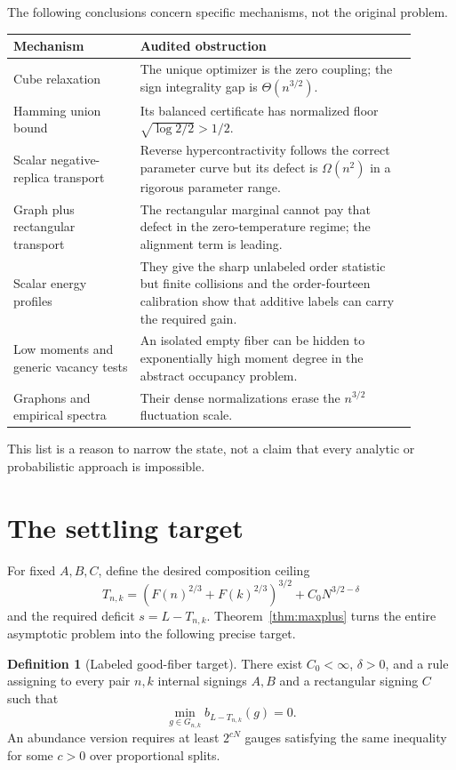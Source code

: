 \documentclass[11pt]{article}
\theoremstyle{definition}
\newtheorem{definition}[theorem]{Definition}
\theoremstyle{remark}
\begin{document}
The following conclusions concern specific mechanisms, not the original
problem.
\begin{center}
\begin{tabular}{p{0.29\linewidth}p{0.61\linewidth}}
\toprule
Mechanism & Audited obstruction \\
\midrule
Cube relaxation & The unique optimizer is the zero coupling; the sign
integrality gap is $\Theta(n^{3/2})$.\\
Hamming union bound & Its balanced certificate has normalized floor
$\sqrt{\log2/2}>1/2$.\\
Scalar negative-replica transport & Reverse hypercontractivity follows the
correct parameter curve but its defect is $\Omega(n^2)$ in a rigorous
parameter range.\\
Graph plus rectangular transport & The rectangular marginal cannot pay that
defect in the zero-temperature regime; the alignment term is leading.\\
Scalar energy profiles & They give the sharp unlabeled order statistic but
finite collisions and the order-fourteen calibration show that additive
labels can carry the required gain.\\
Low moments and generic vacancy tests & An isolated empty fiber can be hidden
to exponentially high moment degree in the abstract occupancy problem.\\
Graphons and empirical spectra & Their dense normalizations erase the
$n^{3/2}$ fluctuation scale.\\
\bottomrule
\end{tabular}
\end{center}

This list is a reason to narrow the state, not a claim that every analytic or
probabilistic approach is impossible.

\section{The settling target}
\label{sec:target}

For fixed $A,B,C$, define the desired composition ceiling
\[
 T_{n,k}=\left(F(n)^{2/3}+F(k)^{2/3}\right)^{3/2}
 +C_0N^{3/2-\delta}
\]
and the required deficit $s=L-T_{n,k}$.  Theorem~\ref{thm:maxplus} turns the
entire asymptotic problem into the following precise target.

\begin{definition}[Labeled good-fiber target]
There exist $C_0<\infty$, $\delta>0$, and a rule assigning to every pair
$n,k$ internal signings $A,B$ and a rectangular signing $C$ such that
\begin{equation}
 \min_{g\in G_{n,k}}b_{L-T_{n,k}}(g)=0.                \label{eq:empty-target}
\end{equation}
An abundance version requires at least $2^{cN}$ gauges satisfying the same
inequality for some $c>0$ over proportional splits.
\end{definition}
\end{document}
